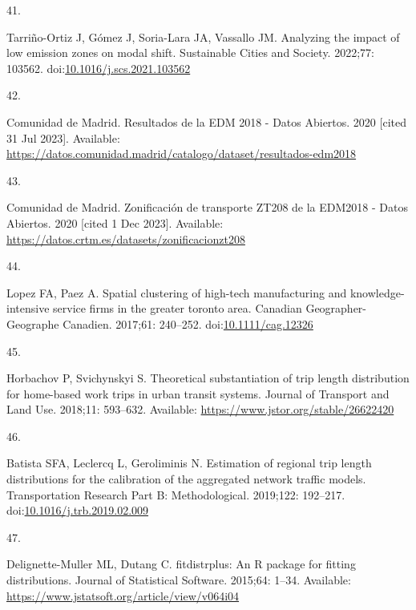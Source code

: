 \documentclass[10pt,letterpaper]{article}
\newlength{\cslhangindent}
\newlength{\csllabelwidth}
\newlength{\cslentryspacingunit} %
\newenvironment{CSLReferences}[2] %
 {%
  \setlength{\parindent}{0pt}
  \ifodd #1
  \let\oldpar\par
  \def\par{\hangindent=\cslhangindent\oldpar}
  \fi
  \setlength{\parskip}{#2\cslentryspacingunit}
 }%
 {}
\newcommand{\CSLLeftMargin}[1]{\parbox[t]{\csllabelwidth}{#1}}
\newcommand{\CSLRightInline}[1]{\parbox[t]{\linewidth - \csllabelwidth}{#1}\break}
\begin{document}
\begin{CSLReferences}{0}{0}
\leavevmode{}%
\CSLLeftMargin{41. }%
\CSLRightInline{Tarriño-Ortiz J, Gómez J, Soria-Lara JA, Vassallo JM.
Analyzing the impact of low emission zones on modal shift. Sustainable
Cities and Society. 2022;77: 103562.
doi:\href{https://doi.org/10.1016/j.scs.2021.103562}{10.1016/j.scs.2021.103562}}

\leavevmode{}%
\CSLLeftMargin{42. }%
\CSLRightInline{Comunidad de Madrid. Resultados de la {EDM} 2018 - Datos
Abiertos. 2020 {[}cited 31 Jul 2023{]}. Available:
\url{https://datos.comunidad.madrid/catalogo/dataset/resultados-edm2018}}

\leavevmode{}%
\CSLLeftMargin{43. }%
\CSLRightInline{Comunidad de Madrid. Zonificación de transporte ZT208 de
la EDM2018 - Datos Abiertos. 2020 {[}cited 1 Dec 2023{]}. Available:
\url{https://datos.crtm.es/datasets/zonificacionzt208}}

\leavevmode{}%
\CSLLeftMargin{44. }%
\CSLRightInline{Lopez FA, Paez A. Spatial clustering of high-tech
manufacturing and knowledge-intensive service firms in the greater
toronto area. Canadian Geographer-Geographe Canadien. 2017;61: 240--252.
doi:\href{https://doi.org/10.1111/cag.12326}{10.1111/cag.12326}}

\leavevmode{}%
\CSLLeftMargin{45. }%
\CSLRightInline{Horbachov P, Svichynskyi S. Theoretical substantiation
of trip length distribution for home-based work trips in urban transit
systems. Journal of Transport and Land Use. 2018;11: 593--632.
Available: \url{https://www.jstor.org/stable/26622420}}

\leavevmode{}%
\CSLLeftMargin{46. }%
\CSLRightInline{Batista SFA, Leclercq L, Geroliminis N. Estimation of
regional trip length distributions for the calibration of the aggregated
network traffic models. Transportation Research Part B: Methodological.
2019;122: 192--217.
doi:\href{https://doi.org/10.1016/j.trb.2019.02.009}{10.1016/j.trb.2019.02.009}}

\leavevmode{}%
\CSLLeftMargin{47. }%
\CSLRightInline{Delignette-Muller ML, Dutang C. {fitdistrplus}: An {R}
package for fitting distributions. Journal of Statistical Software.
2015;64: 1--34. Available:
\url{https://www.jstatsoft.org/article/view/v064i04}}


\end{CSLReferences}
\end{document}
